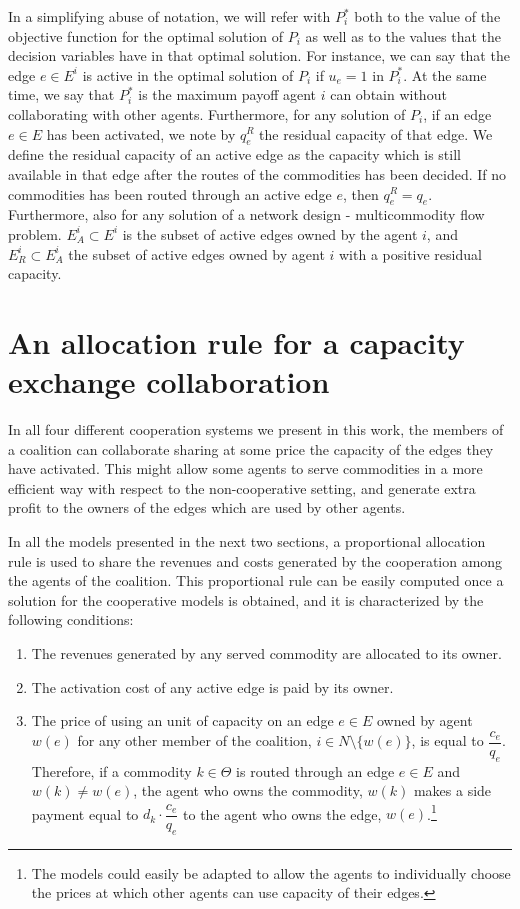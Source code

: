 \documentclass{article}
\begin{document}
In a simplifying abuse of notation, we will refer with $P_i^*$ both to the value of the objective function for the optimal solution of $P_i$ as well as to the values that the decision variables have in that optimal solution. For instance, we can say that the edge $e\in E^i$ is active in the optimal solution of $P_i$ if $u_e=1$ in $P_i^*$. At the same time, we say that $P_i^*$ is the maximum payoff agent $i$ can obtain without collaborating with other agents. Furthermore, for any solution of $P_i$, if an edge $e\in E$ has been activated, we note by $q_e^R$ the residual capacity of that edge. We define the residual capacity of an active edge as the capacity which is still available in that edge after the routes of the commodities has been decided. If no commodities has been routed through an active edge $e$, then $q_e^R = q_e$. Furthermore, also for any solution of a network design - multicommodity flow problem. $E_A^i\subset E^i$ is the subset of active edges owned by the agent $i$, and $E_R^i\subset E_A^i$ the subset of active edges owned by agent $i$ with a positive residual capacity. 

\section{An allocation rule for a capacity exchange collaboration}
\label{seq:allocrule}
In all four different cooperation systems we present in this work, the members of a coalition can collaborate sharing at some price the capacity of the edges they have activated. This might allow some agents to serve commodities in a more efficient way with respect to the non-cooperative setting, and generate extra profit to the owners of the edges which are used by other agents.

In all the models presented in the next two sections, a proportional allocation rule is used to share the revenues and costs generated by the cooperation among the agents of the coalition. This proportional rule can be easily computed once a solution for the cooperative models is obtained, and it is characterized by the following conditions:
\begin{enumerate}
    \item The revenues generated by any served commodity are
    allocated to its owner.
    \item The activation cost of any active edge is paid by its owner.
    \item The price of using an unit of capacity on an edge $e\in E$ owned by agent $w(e)$ for any other member of the coalition, $i\in N\setminus\{w(e)\}$, is equal to $\dfrac{c_e}{q_e}$. Therefore,  if a commodity $k\in \Theta$ is routed through an edge $e	\in E$ and $w(k)\not = w(e)$, the agent who owns the commodity, $w(k)$ makes a side payment equal to $d_k \cdot\dfrac{c_e}{q_e}$ to the agent who owns the edge, $w(e)$.\footnote{The models could easily be adapted to allow the agents to individually choose the prices at which other agents can use capacity of their edges.}
\end{enumerate}
\end{document}

